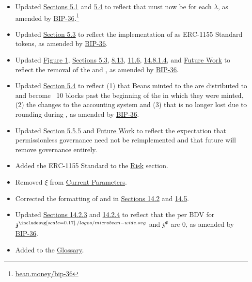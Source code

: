 \documentclass[class=article, crop=false]{standalone}
\begin{document}
\begin{itemize}[topsep=0pt, itemsep=3pt,leftmargin=16pt]
\begin{itemize}
        \item Updated \hyperlink{subsection.5.1}{Sections 5.1} and \hyperlink{subsection.5.4}{5.4} to reflect that   must now be  for each \hyperlink{ht126}{$\lambda$}, as amended by \href{https://bean.money/bip-36}{BIP-36}.\footnote{\href{https://bean.money/bip-36}{bean.money/bip-36}}
        \item Updated \hyperlink{subsection.5.3}{Section 5.3} to reflect the implementation of  as ERC-1155 Standard tokens, as amended by \href{https://bean.money/bip-36}{BIP-36}.
        \item Updated \hyperref[fig 1]{Figure 1}, \hyperlink{subsection.5.3}{Sections 5.3}, \hyperlink{subsection.8.13}{8.13}, \hyperlink{subsection.11.6}{11.6}, \hyperlink{subsubsubsection.14.8.1.4}{14.8.1.4}, and \hyperlink{section.13}{Future Work} to reflect the removal of the  and , as amended by \href{https://bean.money/bip-36}{BIP-36}.
        \item Updated \hyperlink{subsection.5.4}{Section 5.4} to reflect (1) that Beans minted to the  are distributed to  and become  \Bean\ 10 blocks past the beginning of the  in which they were minted, (2) the changes to the  accounting system and (3) that  is no longer lost due to rounding during , as amended by \href{https://bean.money/bip-36}{BIP-36}.
        \item Updated \hyperlink{subsubsection.5.5.5}{Section 5.5.5} and \hyperlink{section.13}{Future Work} to reflect the expectation that permissionless governance need not be reimplemented and that future  will remove governance entirely. 
        \item Added the ERC-1155 Standard to the \hyperlink{section.12}{Risk} section.
        \item Removed $\xi$ from \hyperlink{subsection.14.1}{Current Parameters}.
        \item Corrected the formatting of  and  in \hyperlink{subsection.14.2}{Sections 14.2} and \hyperlink{subsection.14.5}{14.5}.
        \item Updated \hyperlink{subsubsection.14.2.3}{Sections 14.2.3} and \hyperlink{subsubsection.14.2.4}{14.2.4} to reflect that the  per BDV for $\mathfrak{z}^{\bean}$ and $\mathfrak{z}^{\Phi}$ are 0, as amended by \href{https://bean.money/bip-36}{BIP-36}.
        \item Added  to the \hyperlink{subsection.14.11}{Glossary}. 

\end{itemize}
\end{itemize}
\end{document}

